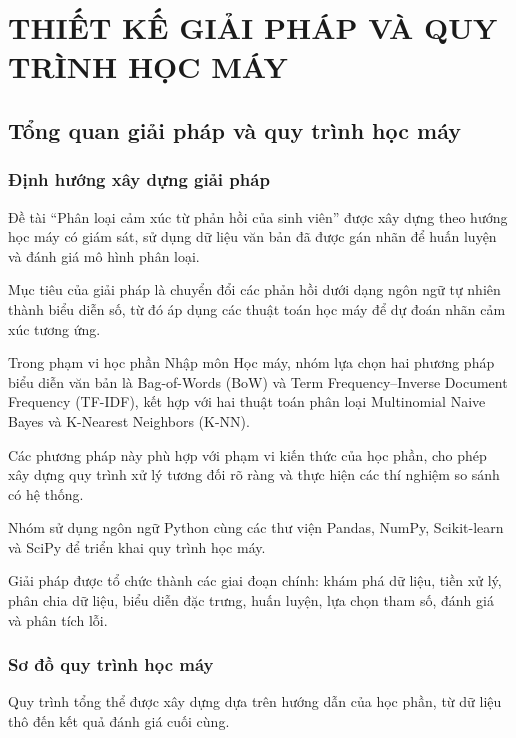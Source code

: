 
\chapter{THIẾT KẾ GIẢI PHÁP VÀ QUY TRÌNH HỌC MÁY}


\section{Tổng quan giải pháp và quy trình học máy}

\subsection{Định hướng xây dựng giải pháp}

Đề tài ``Phân loại cảm xúc từ phản hồi của sinh viên'' được xây dựng theo hướng học máy có giám sát, sử dụng dữ liệu văn bản đã được gán nhãn để huấn luyện và đánh giá mô hình phân loại.

Mục tiêu của giải pháp là chuyển đổi các phản hồi dưới dạng ngôn ngữ tự nhiên thành biểu diễn số, từ đó áp dụng các thuật toán học máy để dự đoán nhãn cảm xúc tương ứng.

Trong phạm vi học phần Nhập môn Học máy, nhóm lựa chọn hai phương pháp biểu diễn văn bản là Bag-of-Words (BoW) và Term Frequency--Inverse Document Frequency (TF-IDF), kết hợp với hai thuật toán phân loại Multinomial Naive Bayes và K-Nearest Neighbors (K-NN).

Các phương pháp này phù hợp với phạm vi kiến thức của học phần, cho phép xây dựng quy trình xử lý tương đối rõ ràng và thực hiện các thí nghiệm so sánh có hệ thống.

Nhóm sử dụng ngôn ngữ Python cùng các thư viện Pandas, NumPy, Scikit-learn và SciPy để triển khai quy trình học máy.

Giải pháp được tổ chức thành các giai đoạn chính: khám phá dữ liệu, tiền xử lý, phân chia dữ liệu, biểu diễn đặc trưng, huấn luyện, lựa chọn tham số, đánh giá và phân tích lỗi.


\subsection{Sơ đồ quy trình học máy}

Quy trình tổng thể được xây dựng dựa trên hướng dẫn của học phần, từ dữ liệu thô đến kết quả đánh giá cuối cùng.

